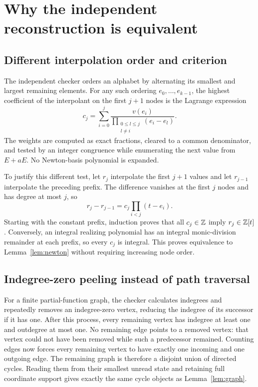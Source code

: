 \section{Why the independent reconstruction is equivalent}\label{app:independent}

\subsection{Different interpolation order and criterion}
The independent checker orders an alphabet by alternating its
smallest and largest remaining elements. For any such ordering
$e_0,\ldots,e_{k-1}$, the highest coefficient of the interpolant
on the first $j+1$ nodes is the Lagrange expression
\begin{equation}\label{eq:lagrange}
 c_j=\sum_{i=0}^j
 \frac{v(e_i)}{\prod_{\substack{0\le l\le j\\l\ne i}}(e_i-e_l)}.
\end{equation}
The weights are computed as exact fractions, cleared to a common
denominator, and tested by an integer congruence while enumerating
the next value from $E+aE$. No Newton-basis polynomial is expanded.

To justify this different test, let $r_j$ interpolate the first
$j+1$ values and let $r_{j-1}$ interpolate the preceding prefix.
The difference vanishes at the first $j$ nodes and has degree at
most $j$, so
\[
 r_j-r_{j-1}=c_j\prod_{i<j}(t-e_i).
\]
Starting with the constant prefix, induction proves that all
$c_j\in\mathbb Z$ imply $r_j\in\mathbb Z[t]$. Conversely, an integral realizing
polynomial has an integral monic-division remainder at each prefix,
so every $c_j$ is integral. This proves equivalence to
Lemma~\ref{lem:newton} without requiring increasing node order.

\subsection{Indegree-zero peeling instead of path traversal}
For a finite partial-function graph, the checker calculates
indegrees and repeatedly removes an indegree-zero vertex, reducing
the indegree of its successor if it has one. After this process,
every remaining vertex has indegree at least one and outdegree
at most one. No remaining edge points to a removed vertex: that
vertex could not have been removed while such a predecessor remained.
Counting edges now forces every remaining vertex to have exactly
one incoming and one outgoing edge. The remaining graph is
therefore a disjoint union of directed cycles. Reading them from
their smallest unread state and retaining full coordinate support
gives exactly the same cycle objects as Lemma~\ref{lem:graph}.

